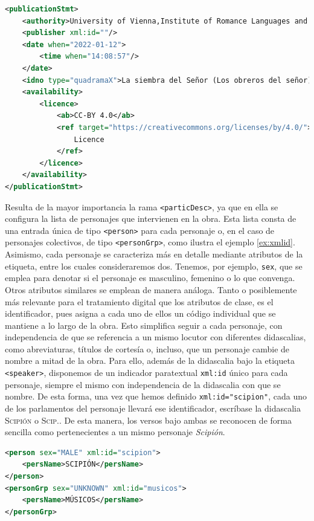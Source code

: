 \begin{exe}
	\ex\label{ex:publicationStmt}\begin{lstlisting}[language=xml,upquote=true,numbers=none]
<publicationStmt>
    <authority>University of Vienna,Institute of Romance Languages and Literatures</authority>
    <publisher xml:id=""/>
    <date when="2022-01-12">
        <time when="14:08:57"/>
    </date>
    <idno type="quadramaX">La siembra del Señor (Los obreros del señor)</idno>
    <availability>
        <licence>
            <ab>CC-BY 4.0</ab>
            <ref target="https://creativecommons.org/licenses/by/4.0/">
                Licence
            </ref>
        </licence>
    </availability>
</publicationStmt>
\end{lstlisting}\end{exe}

Resulta de la mayor importancia la rama \texttt{<particDesc>}, ya que en ella se configura la lista de personajes que intervienen en la obra. Esta lista consta de una entrada única de tipo \texttt{<person>} para cada personaje o, en el caso de personajes colectivos, de tipo \texttt{<personGrp>}, como ilustra el ejemplo \ref{ex:xmlid}. Asimismo, cada personaje se caracteriza más en detalle mediante atributos de la etiqueta, entre los cuales consideraremos dos. Tenemos, por ejemplo, \texttt{sex}, que se emplea para denotar si el personaje es masculino, femenino o lo que convenga. Otros atributos similares se emplean de manera análoga. Tanto o posiblemente más relevante para el tratamiento digital que los atributos de clase, es el identificador, pues asigna a cada uno de ellos un código individual que se mantiene a lo largo de la obra. Esto simplifica seguir a cada personaje, con independencia de que se referencia a un mismo locutor con diferentes didascalias, como abreviaturas, títulos de cortesía o, incluso, que un personaje cambie de nombre a mitad de la obra. Para ello, además de la didascalia bajo la etiqueta \texttt{<speaker>}, disponemos de un indicador paratextual \texttt{xml:id} único para cada personaje, siempre el mismo con independencia de la didascalia con que se nombre. De esta forma, una vez que hemos definido \texttt{xml:id="scipion"}, cada uno de los parlamentos del personaje llevará ese identificador, escríbase la didascalia \textsc{Scipión} o \textsc{Scip.}.  De esta manera, los versos bajo ambas se reconocen de forma sencilla como pertenecientes a un mismo personaje \textit{Scipión}.
\begin{exe}
\ex\label{ex:xmlid}\begin{lstlisting}[language=xml,upquote=true,numbers=none]
<person sex="MALE" xml:id="scipion">
    <persName>SCIPIÓN</persName>
</person>
<personGrp sex="UNKNOWN" xml:id="musicos">
    <persName>MÚSICOS</persName>
</personGrp>
\end{lstlisting}\end{exe}

